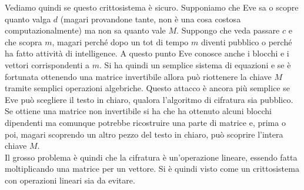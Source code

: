 \documentclass[a4paper,12pt, oneside]{book}
\begin{document}
Vediamo quindi se questo crittosistema è sicuro. Supponiamo che Eve sa o scopre
quanto valga $d$ (magari provandone tante, non è una cosa costosa
computazionalmente) ma non sa quanto vale $M$. Suppongo che veda passare $c$ e
che scopra $m$,
magari perché dopo un tot di tempo $m$ diventi pubblico o perché ha fatto
attività di intelligence. A questo punto Eve conosce anche i blocchi e i vettori
corrispondenti a $m$. Si ha quindi un semplice sistema di equazioni e se è
fortunata ottenendo una matrice invertibile allora può riottenere la chiave $M$
tramite semplici operazioni algebriche. Questo attacco è ancora più semplice se
Eve può scegliere il testo in chiaro, qualora l'algoritmo di cifratura sia
pubblico. \\
Se ottiene una matrice non invertibile si ha che ha ottenuto alcuni blocchi
dipendenti ma comunque potrebbe ricostruire una parte di matrice e, prima o poi,
magari scoprendo un altro pezzo del testo in chiaro, può scoprire l'intera
chiave $M$. \\
Il grosso problema è quindi che la cifratura è un'operazione lineare, essendo
fatta moltiplicando una matrice per un vettore. Si è quindi visto come un
crittosistema con operazioni lineari sia da evitare.
\end{document}
